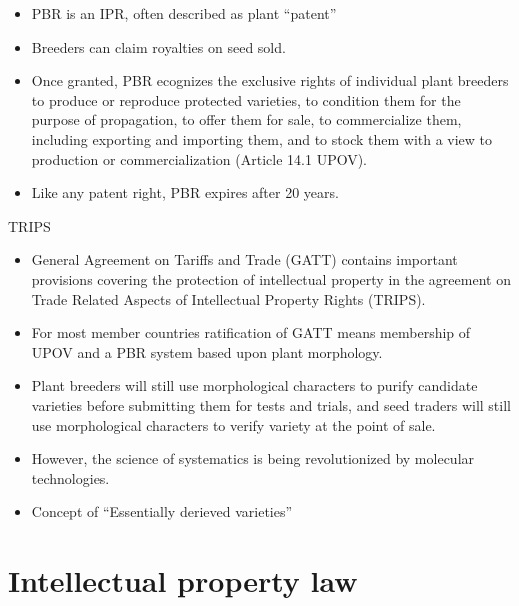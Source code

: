 \documentclass[ignorenonframetext,aspectratio=169]{beamer}
\providecommand{\tightlist}{%
  \setlength{\itemsep}{0pt}\setlength{\parskip}{0pt}}
\begin{document}
\begin{frame}{}
\protect\hypertarget{section-5}{}

\begin{itemize}
\tightlist
\item
  PBR is an IPR, often described as plant ``patent''
\item
  Breeders can claim royalties on seed sold.
\item
  Once granted, PBR ecognizes the exclusive rights of individual plant
  breeders to produce or reproduce protected varieties, to condition
  them for the purpose of propagation, to offer them for sale, to
  commercialize them, including exporting and importing them, and to
  stock them with a view to production or commercialization (Article
  14.1 UPOV).
\item
  Like any patent right, PBR expires after 20 years.
\end{itemize}

\end{frame}

\begin{frame}{TRIPS}
\protect\hypertarget{trips}{}

\begin{itemize}
\tightlist
\item
  General Agreement on Tariffs and Trade (GATT) contains important
  provisions covering the protection of intellectual property in the
  agreement on Trade Related Aspects of Intellectual Property Rights
  (TRIPS).
\item
  For most member countries ratification of GATT means membership of
  UPOV and a PBR system based upon plant morphology.
\item
  Plant breeders will still use morphological characters to purify
  candidate varieties before submitting them for tests and trials, and
  seed traders will still use morphological characters to verify variety
  at the point of sale.
\item
  However, the science of systematics is being revolutionized by
  molecular technologies.
\item
  Concept of ``Essentially derieved varieties''
\end{itemize}

\end{frame}

\hypertarget{intellectual-property-law}{%
\section{Intellectual property law}\label{intellectual-property-law}}
\end{document}
